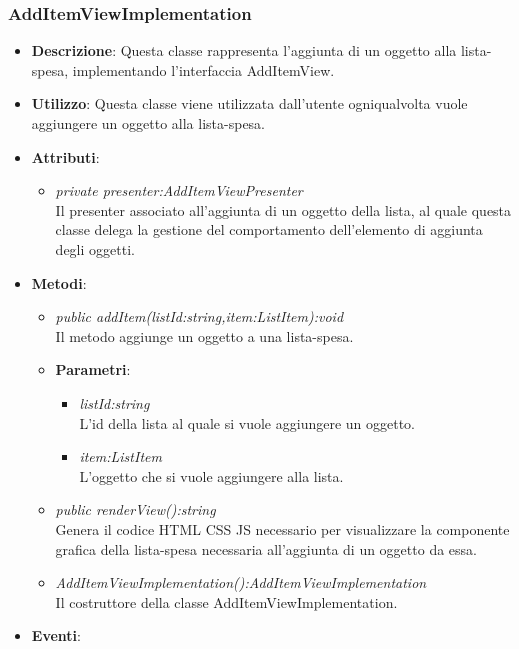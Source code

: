 \subsubsection{AddItemViewImplementation}
\begin{itemize}
\item \textbf{Descrizione}: Questa classe rappresenta l'aggiunta di un oggetto alla lista-spesa, implementando l'interfaccia AddItemView.
\item \textbf{Utilizzo}: Questa classe viene utilizzata dall'utente ogniqualvolta vuole aggiungere un oggetto alla lista-spesa.
\item \textbf{Attributi}: 
	\begin{itemize}
	\item \textit{private presenter:AddItemViewPresenter}\\
	Il presenter associato all'aggiunta di un oggetto della lista, al quale questa classe delega la gestione del comportamento dell'elemento di aggiunta degli oggetti.
	\end{itemize}
\item \textbf{Metodi}:
	\begin{itemize}
	\item \textit{public addItem(listId:string,item:ListItem):void}\\
	Il metodo aggiunge un oggetto a una lista-spesa.
			\item{\textbf{Parametri}: \begin{itemize}
			\item \textit{listId:string}\\
			L'id della lista al quale si vuole aggiungere un oggetto.
			\item \textit{item:ListItem}\\
			L'oggetto che si vuole aggiungere alla lista.
			\end{itemize}}
	\item \textit{public renderView():string}\\
	Genera il codice HTML CSS JS necessario per visualizzare la componente grafica della lista-spesa necessaria all'aggiunta di un oggetto da essa.
	\item \textit{AddItemViewImplementation():AddItemViewImplementation}\\
	Il costruttore della classe AddItemViewImplementation.
	\end{itemize}
\item \textbf{Eventi}:
\end{itemize}

